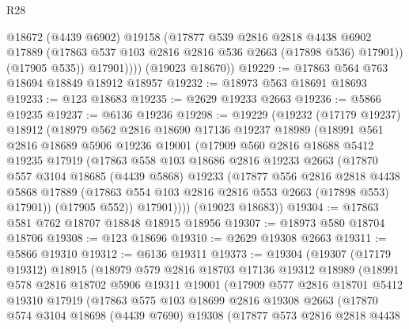 \begin{lexlean}{R28}
\begin{coremodule}
                @18672
                (@4439 @6902)
                @19158
                (@17877
                  @539
                  @2816
                  @2818
                  @4438
                  @6902
                  @17889
                  (@17863 @537 @103 @2816 @2816 @536 @2663 (@17898 @536) @17901))
                (@17905 @535))
              @17901))))
      (@19023 @18670))
@19229 := @17863 @564 @763 @18694 @18849 @18912 @18957
@19232 := @18973 @563 @18691 @18693
@19233 := @123 @18683
@19235 := @2629 @19233 @2663
@19236 := @5866 @19235
@19237 := @6136 @19236
@19298 := @19229
    (@19232
      (@17179 @19237)
      @18912
      (@18979
        @562
        @2816
        @18690
        @17136
        @19237
        @18989
        (@18991
          @561
          @2816
          @18689
          @5906
          @19236
          @19001
          (@17909
            @560
            @2816
            @18688
            @5412
            @19235
            @17919
            (@17863
              @558
              @103
              @18686
              @2816
              @19233
              @2663
              (@17870
                @557
                @3104
                @18685
                (@4439 @5868)
                @19233
                (@17877
                  @556
                  @2816
                  @2818
                  @4438
                  @5868
                  @17889
                  (@17863 @554 @103 @2816 @2816 @553 @2663 (@17898 @553) @17901))
                (@17905 @552))
              @17901))))
      (@19023 @18683))
@19304 := @17863 @581 @762 @18707 @18848 @18915 @18956
@19307 := @18973 @580 @18704 @18706
@19308 := @123 @18696
@19310 := @2629 @19308 @2663
@19311 := @5866 @19310
@19312 := @6136 @19311
@19373 := @19304
    (@19307
      (@17179 @19312)
      @18915
      (@18979
        @579
        @2816
        @18703
        @17136
        @19312
        @18989
        (@18991
          @578
          @2816
          @18702
          @5906
          @19311
          @19001
          (@17909
            @577
            @2816
            @18701
            @5412
            @19310
            @17919
            (@17863
              @575
              @103
              @18699
              @2816
              @19308
              @2663
              (@17870
                @574
                @3104
                @18698
                (@4439 @7690)
                @19308
                (@17877
                  @573
                  @2816
                  @2818
                  @4438

\end{coremodule}
\end{lexlean}
